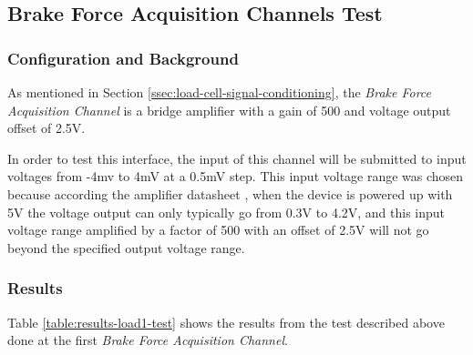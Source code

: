 \subsection{Brake Force Acquisition Channels Test}\label{sec:brake-pressure-acquisition-channels-test}

	\subsubsection{Configuration and Background}

		As mentioned in Section \ref{ssec:load-cell-signal-conditioning}, the \textit{Brake Force Acquisition Channel} is a bridge amplifier with a gain of 500 and voltage output offset of 2.5V.
		\par
		In order to test this interface, the input of this channel will be submitted to input voltages from -4mv to 4mV at a 0.5mV step. This input voltage range was chosen because according the amplifier datasheet \cite{ina125}, when the device is powered up with 5V the voltage output can only typically go from 0.3V to 4.2V, and this input voltage range amplified by a factor of 500 with an offset of 2.5V will not go beyond the specified output voltage range.
		
	\subsubsection{Results}


			Table \ref{table:results-load1-test} shows the results from the test described above done at the first \textit{Brake Force Acquisition Channel}.

